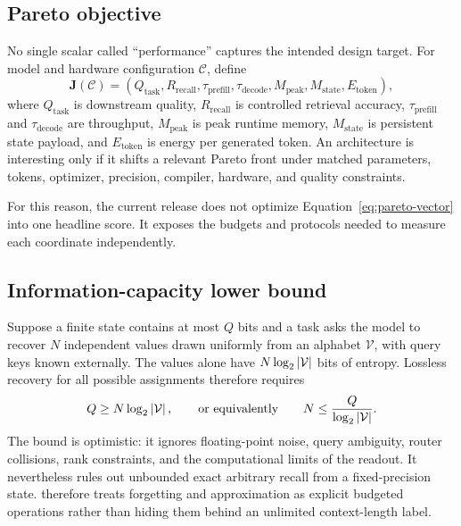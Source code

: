 \subsection{Pareto objective}

No single scalar called ``performance'' captures the intended design target.
For model and hardware configuration \(\mathcal{C}\), define
\begin{equation}
  \mathbf{J}(\mathcal{C}) =
  \left(
  Q_{\mathrm{task}},
  R_{\mathrm{recall}},
  \tau_{\mathrm{prefill}},
  \tau_{\mathrm{decode}},
  M_{\mathrm{peak}},
  M_{\mathrm{state}},
  E_{\mathrm{token}}
  \right),
  \label{eq:pareto-vector}
\end{equation}
where \(Q_{\mathrm{task}}\) is downstream quality,
\(R_{\mathrm{recall}}\) is controlled retrieval accuracy,
\(\tau_{\mathrm{prefill}}\) and \(\tau_{\mathrm{decode}}\) are throughput,
\(M_{\mathrm{peak}}\) is peak runtime memory, \(M_{\mathrm{state}}\) is
persistent state payload, and \(E_{\mathrm{token}}\) is energy per generated
token. An architecture is interesting only if it shifts a relevant Pareto
front under matched parameters, tokens, optimizer, precision, compiler,
hardware, and quality constraints.

For this reason, the current release does not optimize
Equation~\eqref{eq:pareto-vector} into one headline score. It exposes the
budgets and protocols needed to measure each coordinate independently.

\subsection{Information-capacity lower bound}

Suppose a finite state contains at most \(Q\) bits and a task asks the model to
recover \(N\) independent values drawn uniformly from an alphabet
\(\mathcal{V}\), with query keys known externally. The values alone have
\(N\log_2\left\lvert \mathcal{V}\right\rvert\) bits of entropy. Lossless recovery for all
possible assignments therefore requires
\begin{equation}
  Q\ge N\log_2\left\lvert \mathcal{V}\right\rvert,
  \qquad\text{or equivalently}\qquad
  N\le \frac{Q}{\log_2\left\lvert \mathcal{V}\right\rvert}.
  \label{eq:counting-bound}
\end{equation}
The bound is optimistic: it ignores floating-point noise, query ambiguity,
router collisions, rank constraints, and the computational limits of the
readout. It nevertheless rules out unbounded exact arbitrary recall from a
fixed-precision state. \ALUCLU therefore treats forgetting and approximation
as explicit budgeted operations rather than hiding them behind an unlimited
context-length label.

